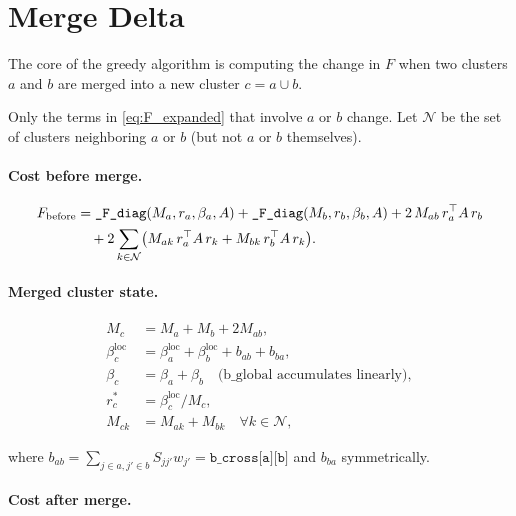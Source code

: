 \documentclass[11pt]{article}
\begin{document}
\section{Merge Delta}

The core of the greedy algorithm is computing the change in $F$ when two
clusters $a$ and $b$ are merged into a new cluster $c = a \cup b$.

Only the terms in \eqref{eq:F_expanded} that involve $a$ or $b$ change.
Let $\mathcal{N}$ be the set of clusters neighboring $a$ or $b$ (but not $a$
or $b$ themselves).

\paragraph{Cost before merge.}

\begin{align}
  F_{\mathrm{before}} &= \texttt{\_F\_diag}(M_a, r_a, \beta_a, A)
                         + \texttt{\_F\_diag}(M_b, r_b, \beta_b, A)
                         + 2\,M_{ab}\,r_a^\top A\,r_b \notag\\
                       &\quad + 2\sum_{k\in\mathcal{N}}\bigl(M_{ak}\,r_a^\top A\,r_k
                         + M_{bk}\,r_b^\top A\,r_k\bigr).
\end{align}

\paragraph{Merged cluster state.}

\begin{align}
  M_c           &= M_a + M_b + 2M_{ab}, \label{eq:Mc}\\
  \beta_c^{\mathrm{loc}} &= \beta_a^{\mathrm{loc}} + \beta_b^{\mathrm{loc}} + b_{ab} + b_{ba}, \label{eq:bloc}\\
  \beta_c       &= \beta_a + \beta_b \quad\text{(b\_global accumulates linearly)}, \label{eq:bglobal}\\
  r_c^*         &= \beta_c^{\mathrm{loc}} / M_c, \label{eq:repc}\\
  M_{ck}        &= M_{ak} + M_{bk} \quad\forall k\in\mathcal{N}, \label{eq:Mck}
\end{align}

where $b_{ab} = \sum_{j\in a, j'\in b} S_{jj'} w_{j'} = \texttt{b\_cross[a][b]}$
and $b_{ba}$ symmetrically.

\paragraph{Cost after merge.}
\end{document}

